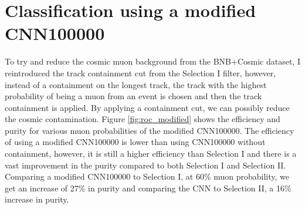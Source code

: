 \newpage

\section{Classification using a modified CNN100000}
To try and reduce the cosmic muon background from the BNB+Cosmic dataset, I reintroduced the track containment cut from the Selection I filter, however, instead of a containment on the longest track, the track with the highest probability of being a muon from an event is chosen and then the track containment is applied. By applying a containment cut, we can possibly reduce the cosmic contamination. Figure \ref{fig:roc_modified} shows the efficiency and purity for various muon probabilities of the modified CNN100000. The efficiency of using a modified CNN100000 is lower than using CNN100000 without containment, however, it is still a higher efficiency than Selection I and there is a vast improvement in the purity compared to both Selection I and Selection II. Comparing a modified CNN100000 to Selection I, at 60\% muon probability, we get an increase of 27\% in purity and comparing the CNN to Selection II, a 16\% increase in purity. 

